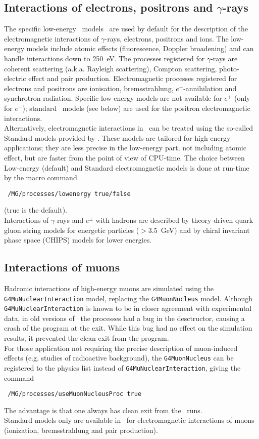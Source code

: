 \subsection{Interactions of electrons, positrons and $\gamma$-rays}
The specific low-energy \geant\ models~\cite{geant4physics} are used by default for the description 
of the electromagnetic interactions of $\gamma$-rays, electrons, positrons and ions. The 
low-energy models include atomic effects (fluorescence, Doppler broadening) and can handle 
interactions down to 250~eV. The processes registered for $\gamma$-rays are coherent 
scattering (a.k.a. Rayleigh scattering), Compton scattering, photo-electric effect and pair 
production. Electromagnetic processes registered for electrons and positrons are ionisation, 
bremsstrahlung, $e^{+}$-annihilation and synchrotron radiation. Specific low-energy models 
are not available for $e^{+}$ (only for $e^{-}$); standard \geant\ models (see below) are 
used for the positron electromagnetic interactions. \\
Alternatively, electromagnetic interactions in \mage\ can be treated using the 
so-called Standard models provided by \geant. These models are tailored for high-energy 
applications; they are less precise in the low-energy part, not including atomic effect, but are 
faster from the point of view of CPU-time. The choice between Low-energy (default) and Standard 
electromagnetic models is done at run-time by the macro command
\begin{lstlisting}
 /MG/processes/lowenergy true/false
\end{lstlisting}
(true is the default). \\
Interactions of $\gamma$-rays and $e^{\pm}$ with hadrons are described by theory-driven quark-gluon 
string models for energetic particles ($> 3.5$~GeV) and by chiral invariant phase space (CHIPS) 
models for lower energies.
%
\subsection{Interactions of muons}
Hadronic interactions of high-energy muons are simulated using the \texttt{G4MuNuclearInteraction} model, 
replacing the \texttt{G4MuonNucleus} model. Although \texttt{G4MuNuclearInteraction} is known to be in 
closer agreement with experimental data, in old versions of \geant\ the processes had a bug in the 
desctructor, causing a crash of the program at the exit. While this bug had no effect on the simulation 
results, it prevented the clean exit from the program. \\
For those application not requiring the precise description of muon-induced effects (e.g. studies 
of radioactive background), the \texttt{G4MuonNucleus} can be registered to the physics list 
instead of \texttt{G4MuNuclearInteraction}, giving the command 
\begin{lstlisting}
 /MG/processes/useMuonNucleusProc true
\end{lstlisting}
The advantage is that one always has clean exit from the \mage\ runs.\\
Standard models only are available in \geant\ for electromagnetic interactions of muons (ionization, 
bremsstrahlung and pair production). 
%
